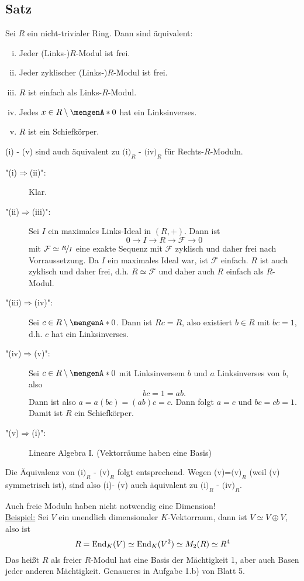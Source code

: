\subsection[Satz: Alle $R$-Moduln sind frei $\iff$ $R$ ist Schiefkörper]{Satz} %
\label{sub:238}
Sei $R$ ein nicht-trivialer Ring. Dann sind äquivalent:
\begin{enumerate}[(i)]
	\item Jeder (Links-)$R$-Modul ist frei.
	\item Jeder zyklischer (Links-)$R$-Modul ist frei.
	\item $R$ ist einfach als Links-$R$-Modul.
	\item Jedes $x \in R \setminus \set{0}$ hat ein Linksinverses.
	\item $R$ ist ein Schiefkörper.
\end{enumerate}
(i) - (v) sind auch äquivalent zu $\text{(i)}_R$ - $\text{(iv)}_R$ für Rechts-$R$-Moduln.
\begin{description}
	\item["(i)$\Rightarrow$(ii)":] Klar. 
	\item["(ii)$\Rightarrow $(iii)":] Sei $I$ ein maximales Links-Ideal in $(R,+)$. Dann ist 
	\[
		0 \longrightarrow I  \longrightarrow R \longrightarrow \mathcal{F} \longrightarrow 0
	\]
	mit $\mathcal{F} \simeq \nicefrac{R}{I}$ eine exakte Sequenz mit $\mathcal{F}$ zyklisch und daher frei nach Vorraussetzung. Da $I$ ein maximales Ideal war, ist 
	$\mathcal{F}$ einfach. $R$ ist auch zyklisch und daher frei, d.h. $R \simeq \mathcal{F}$ und daher auch $R$ einfach als $R$-Modul.
	\item["(iii)$\Rightarrow $(iv)":] Sei $c \in R \setminus \set{0} $. Dann ist $Rc=R$, also existiert $b \in R$ mit $b c = 1$, d.h. $c$ hat ein Linksinverses.
	\item["(iv)$\Rightarrow$(v)":] Sei $c \in R \setminus \set{0}$ mit Linksinversem $b$ und $a$ Linksinverses von $b$, also
	\[
		b c = 1 = a b.
	\]
	Dann ist also $a = a (b c) = (a b) c = c$. Dann folgt $a=c$ und $b c= c b = 1$. Damit ist $R$ ein Schiefkörper.
	\item["(v)$\Rightarrow$(i)":] Lineare Algebra I. (Vektorräume haben eine Basis)
\end{description}
Die Äquivalenz von $\text{(i)}_R$ - $\text{(v)}_R$ folgt entsprechend. Wegen (v)=$\text{(v)}_R$ (weil (v) symmetrisch ist), sind also (i)- (v) auch äquivalent zu
$\text{(i)}_R$ - $\text{(iv)}_R$. \bewende

Auch freie Moduln haben nicht notwendig eine Dimension! \\
\uline{Beispiel:} Sei $V$ ein unendlich dimensionaler $K$-Vektorraum, dann ist $V \simeq V \oplus V$, also ist 
\[
	R = \operatorname{End}_K(V) \simeq \operatorname{End}_K(V^2) \simeq M_2(R) \simeq R^4
\]
Das heißt $R$ als freier $R$-Modul hat eine Basis der Mächtigkeit 1, aber auch Basen jeder anderen Mächtigkeit. Genaueres in Aufgabe 1.b) von Blatt 5.

